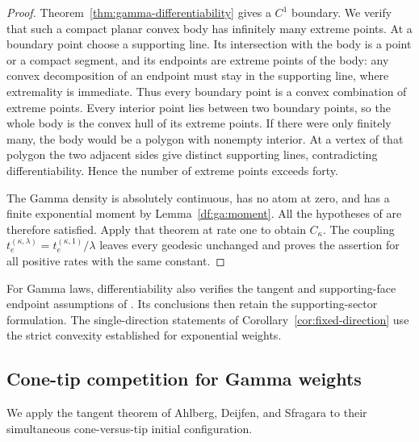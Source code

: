 \begin{proof}
Theorem~\ref{thm:gamma-differentiability} gives a $C^1$ boundary. We verify that such a
compact planar convex body has infinitely many extreme points.
At a boundary point choose a supporting line. Its intersection with
the body is a point or a compact segment, and its endpoints are
extreme points of the body: any convex decomposition of an endpoint
must stay in the supporting line, where extremality is immediate.
Thus every boundary point is a convex combination of extreme points.
Every interior point lies between two boundary points, so the whole
body is the convex hull of its extreme points. If there were only
finitely many, the body would be a polygon with nonempty interior.
At a vertex of that polygon the two adjacent sides give distinct
supporting lines, contradicting differentiability. Hence the number
of extreme points exceeds forty.

The Gamma density is absolutely continuous, has no atom at zero,
and has a finite exponential moment by Lemma~\ref{df:ga:moment}.
All the hypotheses of \cite[Theorem~1.2]{DEP2024} are therefore
satisfied. Apply that theorem at rate one to obtain $C_\kappa$.
The coupling $t_e^{(\kappa,\lambda)}=
t_e^{(\kappa,1)}/\lambda$ leaves every geodesic unchanged and proves
the assertion for all positive rates with the same constant.
\end{proof}

For Gamma laws, differentiability also verifies the tangent and
supporting-face endpoint assumptions of \cite{DH2017}. Its conclusions
then retain the supporting-sector formulation. The single-direction
statements of Corollary~\ref{cor:fixed-direction} use the strict
convexity established for exponential weights.

\subsection{Cone-tip competition for Gamma weights}

We apply the tangent theorem of Ahlberg, Deijfen, and Sfragara
\cite[Theorem~1]{ADS2026} to their simultaneous cone-versus-tip initial
configuration.

